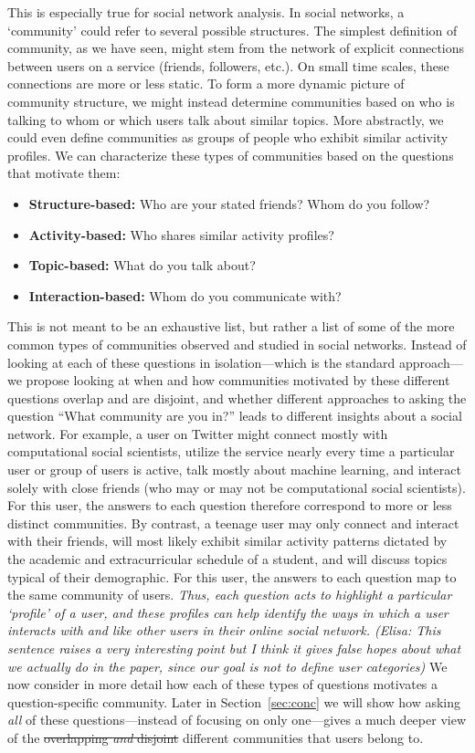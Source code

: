 This is especially true for social network analysis. In social networks, a `community' could refer to several possible structures. The simplest definition of community, as we have seen, might stem from the network of explicit connections between users on a service (friends, followers, etc.). On small time scales, these connections are more or less static. To form a more dynamic picture of community structure, we might instead determine communities based on who is talking to whom or which users talk about similar topics.
More abstractly, we could even define communities as groups of people who exhibit similar activity profiles. We can characterize these types of communities based on the questions that motivate them:
\begin{itemize}
	\item \textbf{Structure-based:} Who are your stated friends? Whom do you follow?
	\item \textbf{Activity-based:} Who shares similar activity profiles?
	\item \textbf{Topic-based:} What do you talk about?
	\item \textbf{Interaction-based:} Whom do you communicate with?
\end{itemize}

This is not meant to be an exhaustive list, but rather a list of some of the more common types of communities observed and studied in social networks. Instead of looking at each of these questions in isolation---which is the standard approach---we propose looking at when and how communities motivated by these different questions overlap and are disjoint, and whether different approaches to asking the question ``What community are you in?'' leads to different insights about a social network. For example, a user on Twitter might connect mostly with computational social scientists, utilize the service nearly every time a particular user or group of users is active, talk mostly about machine learning, and interact solely with close friends (who may or may not be computational social scientists). 
For this user, the answers to each question therefore correspond to more or less distinct communities. By contrast, a teenage user may only connect and interact with their friends, will most likely exhibit similar activity patterns dictated by the academic and extracurricular schedule of a student, and will discuss topics typical of their demographic. For this user, the answers to each question map to the same community of users.
\textit{Thus, each question acts to highlight a particular `profile' of a user, and these profiles can help identify the ways in which a user interacts with and like other users in their online social network. (Elisa: This sentence raises a very interesting point but I think it gives false hopes about what we actually do in the paper, since our goal is not to define user categories)} 
We now consider in more detail how each of these types of questions motivates a question-specific community. Later in Section~\ref{sec:conc} we will show how asking \emph{all} of these questions---instead of focusing on only one---gives a much deeper view of the \sout{overlapping \emph{and} disjoint} different communities that users belong to. 

